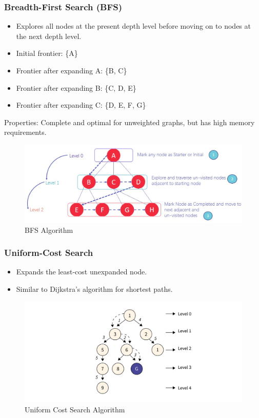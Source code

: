 \documentclass[8pt]{article}
\begin{document}
\newpage
\subsubsection{Breadth-First Search (BFS)}
\begin{itemize}
    \item Explores all nodes at the present depth level before moving on to nodes at the next depth level.
    \item Initial frontier: \{A\}
    \item Frontier after expanding A: \{B, C\}
    \item Frontier after expanding B: \{C, D, E\}
    \item Frontier after expanding C: \{D, E, F, G\}
\end{itemize}
Properties: Complete and optimal for unweighted graphs, but has high memory requirements.

\begin{figure}[!h]
    \centering
    \includegraphics[width=0.5\linewidth]{images/020820_0543_BreadthFirs1ropped.jpg}
    \caption{BFS Algorithm}
    \label{fig:enter-label}
\end{figure}

\subsubsection{Uniform-Cost Search}
\begin{itemize}
    \item Expands the least-cost unexpanded node.
    \item Similar to Dijkstra's algorithm for shortest paths.
\end{itemize}

\begin{figure}[!h]
    \centering
    \includegraphics[width=0.5\linewidth]{images/uniform search.PNG}
    \caption{Uniform Cost Search Algorithm}
    \label{fig:enter-label}
\end{figure}
\end{document}
